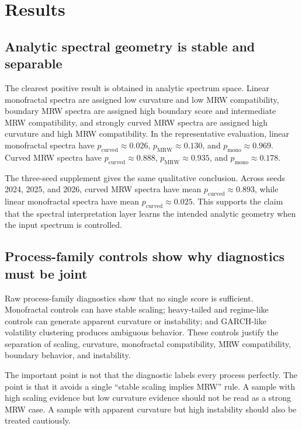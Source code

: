 \section{Results}

\subsection{Analytic spectral geometry is stable and separable}

The clearest positive result is obtained in analytic spectrum space. Linear
monofractal spectra are assigned low curvature and low MRW compatibility,
boundary MRW spectra are assigned high boundary score and intermediate MRW
compatibility, and strongly curved MRW spectra are assigned high curvature and
high MRW compatibility. In the representative evaluation, linear monofractal
spectra have \(p_{\mathrm{curved}}\approx0.026\),
\(p_{\mathrm{MRW}}\approx0.130\), and
\(p_{\mathrm{mono}}\approx0.969\). Curved MRW spectra have
\(p_{\mathrm{curved}}\approx0.888\),
\(p_{\mathrm{MRW}}\approx0.935\), and
\(p_{\mathrm{mono}}\approx0.178\).

The three-seed supplement gives the same qualitative conclusion. Across seeds
2024, 2025, and 2026, curved MRW spectra have mean
\(p_{\mathrm{curved}}\approx0.893\), while linear monofractal spectra have
mean \(p_{\mathrm{curved}}\approx0.025\). This supports the claim that the
spectral interpretation layer learns the intended analytic geometry when the
input spectrum is controlled.



\subsection{Process-family controls show why diagnostics must be joint}

Raw process-family diagnostics show that no single score is sufficient.
Monofractal controls can have stable scaling; heavy-tailed and regime-like
controls can generate apparent curvature or instability; and GARCH-like
volatility clustering produces ambiguous behavior. These controls justify the
separation of scaling, curvature, monofractal compatibility, MRW compatibility,
boundary behavior, and instability.

The important point is not that the diagnostic labels every process perfectly.
The point is that it avoids a single ``stable scaling implies MRW'' rule. A
sample with high scaling evidence but low curvature evidence should not be
read as a strong MRW case. A sample with apparent curvature but high
instability should also be treated cautiously.

